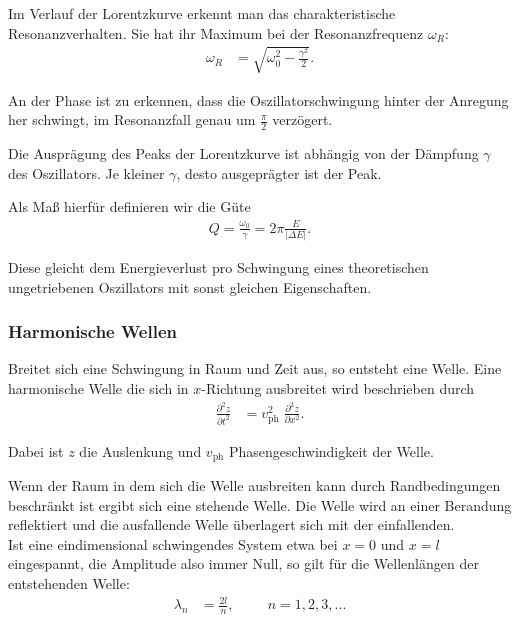 Im Verlauf der Lorentzkurve erkennt man das charakteristische Resonanzverhalten.
Sie hat ihr Maximum bei der Resonanzfrequenz $\omega_R$:
\begin{align}
    \label{eq:Resonanzfrequenz}
    \omega_R &= \sqrt{\omega_0^2 - \frac{\gamma^2}{2}}.
\end{align}

An der Phase ist zu erkennen, dass die Oszillatorschwingung hinter der Anregung her schwingt, im Resonanzfall genau um $\frac{\pi}{2}$ verzögert.

Die Ausprägung des Peaks der Lorentzkurve ist abhängig von der Dämpfung $\gamma$ des Oszillators.
Je kleiner $\gamma$, desto ausgeprägter ist der Peak.

Als Maß hierfür definieren wir die Güte
\begin{align}
    \label{eq:Guete}
    Q = \frac{\omega_0}{\gamma} = 2 \pi \frac{E}{|\Delta E|}.
\end{align}

Diese gleicht dem Energieverlust pro Schwingung eines theoretischen ungetriebenen Oszillators mit sonst gleichen Eigenschaften.

\subsubsection*{Harmonische Wellen}

Breitet sich eine Schwingung in Raum und Zeit aus, so entsteht eine Welle.
Eine harmonische Welle die sich in $x$-Richtung ausbreitet wird beschrieben durch
\begin{align*}
    \frac{\partial^2 z}{\partial t^2} &= v_\mathrm{ph}^2 \; \frac{\partial^2 z}{\partial x^2}.
\end{align*}

Dabei ist $z$ die Auslenkung und $v_\mathrm{ph}$ Phasengeschwindigkeit der Welle.

Wenn der Raum in dem sich die Welle ausbreiten kann durch Randbedingungen beschränkt ist ergibt sich eine stehende Welle.
Die Welle wird an einer Berandung reflektiert und die ausfallende Welle überlagert sich mit der einfallenden.\\
Ist eine eindimensional schwingendes System etwa bei $x=0$ und $x=l$ eingespannt, die Amplitude also immer Null, so gilt für die Wellenlängen der entstehenden Welle:
\begin{align}
    \lambda_n &= \frac{2l}{n}, \hspace{1cm} n=1,2,3,...
\end{align}


